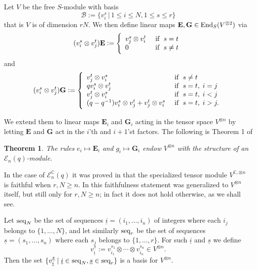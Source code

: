 \documentclass[10pt,a4,twoside,hidelinks,rm]{article}
\newcommand{\seqN}{{\rm seq}_N}
\newcommand{\seqr}{{\rm seq}_r}
\newcommand{\C}{\mathbb C}
\newcommand{\End}{{\rm End}}
\newcommand{\E}{ {\mathcal E}_n(q)}
\theoremstyle{plain}
\newtheorem{teo}{Theorem}%
\begin{document}
\medskip
Let $V$ be the free $S$-module with basis
\begin{equation}\label{95}
{\mathcal B}:=  \{ v_{i}^s  \, | \,  1 \le i \le N, 1 \le s \le r \}
\end{equation}
that is 
$ V $ is of dimension $ rN$.
We then define linear maps $\mathbf{E}, \mathbf{G} \in \End_S(V^{\otimes 2})  $ via
\begin{equation}{\label{operatorE}}
  (v_i^s\otimes v_j^t)\mathbf{E}:=\left\{\begin{array}{ll}
  v_j^s\otimes v_i^t&\mbox{ if }\;s =  t\\
0&\mbox{ if }\; s \neq t \\
\end{array}\right.
\end{equation}
and
\begin{equation}{\label{operatorG}}
(v_i^s\otimes v_j^t)\mathbf{G}:=\left\{\begin{array}{ll}v_j^t\otimes v_i^s&\mbox{ if }\;s\neq t\\
qv_i^s\otimes v_j^t&\mbox{ if }\;s=t,\;i=j\\
v_j^t\otimes v_i^s&\mbox{ if }\;s=t,\;i <j\\
(q-q^{-1})v_i^s\otimes v_j^t+v_j^t\otimes v_i^s&\mbox{ if
}\;s=t,\;i >j.\end{array}\right.
\end{equation}

We extend them to linear  maps $\mathbf{E}_i$ and $\mathbf{G}_i$ acting
in the tensor space $V^{\otimes n}$ by letting
$\mathbf{E}$ and $\mathbf{G}$
act in the $i$'th and $i+1$'st
factors. The following is Theorem 1 of \cite{Ry} 
\begin{teo}
  The rules $ e_i \mapsto \mathbf{E}_i $ and $ g_i \mapsto \mathbf{G}_i $ endow
  $V^{\otimes n}$ with the structure of
  an $ \E$-module.
\end{teo}
In the case of
$ { \mathcal E}^{\C}_n(q) $ 
it was proved in \cite{Ry} that the specialized tensor module $ V^{\C, \otimes n} $ is faithful when
$  r,N \ge n $. In \cite{ER} this faithfulness statement was generalized to $ V^{\otimes n} $ itself, 
but still only for $  r,N \ge n $; in fact it does not hold otherwise, as we shall see.

\medskip
Let $ \seqN $ be the set of sequences $ \underline{i}= (i_1, \ldots, i_n ) $ of
integers where each $ i_j $ belongs to $ \{ 1,\ldots, N\} $, and let similarly 
$ \seqr $ be the set of sequences $ \underline{s}= (s_1, \ldots, s_n ) $ where each 
$s_j $ belongs to $ \{ 1,\ldots, r\} $. For such $ \underline{i} $ and
$ \underline{s} $ we define
\begin{equation}
v_{\underline{i}}^{\underline{s}}:=v_{i_1}^{s_1} \otimes \cdots  \otimes  v_{i_n}^{s_n}\in V^{\otimes n}.
\end{equation}
Then the set $ \{ v_{\underline{i}}^{\underline{s}} \mid \underline{i} \in \seqN,  \underline{s} \in \seqr \} $
is a basis for $ V^{\otimes n} $.
\end{document}
